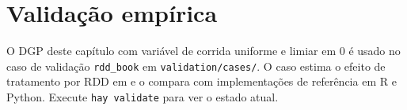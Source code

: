 \section{Validação empírica}

O DGP deste capítulo com variável de corrida uniforme e limiar em 0 é usado
no caso de validação \texttt{rdd_book} em \texttt{validation/cases/}. O
caso estima o efeito de tratamento por RDD em \hayashi{} e o compara com
implementações de referência em R e Python. Execute \lstinline{hay validate}
para ver o estado atual.
